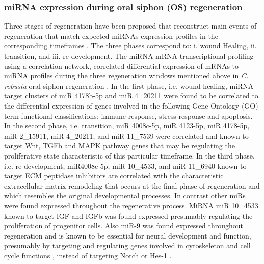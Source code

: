 \documentclass[graybox]{svmult}
\begin{document}
\subsubsection{miRNA expression during oral siphon (OS) regeneration}
Three stages of regeneration have been proposed that reconstruct main events of 
regeneration that match expected miRNAs expression profiles in the 
corresponding timeframes \citep{Knapp:2013}. The three phases correspond to: i. 
wound Healing, ii. transition, and iii. re-development. The miRNA-mRNA 
transcriptional profiling using a correlation network, correlated differential 
expression of mRNAs to miRNA profiles during the three regeneration windows 
mentioned above in \textit{C. robusta} oral siphon regeneration 
\citep{Spina:2017}. In the first phase, i.e. wound healing, miRNA target 
clusters of miR 4178b-5p and 
miR 4\_20211 were found to be correlated to the differential expression of 
genes involved in the following Gene Ontology (GO) term functional 
classifications: immune response, stress response and apoptosis. In the second 
phase, i.e. transition, 
miR 4008c-5p, miR 4123-5p, miR 4178-5p, miR 2\_15911, miR 4\_20211, and miR 
11\_7539 were correlated and known to target Wnt, TGFb and MAPK pathway genes 
that may be regulating the proliferative state characteristic of this particular 
timeframe. In the third phase, i.e. re-development, miR4008c-5p, miR 10\_4533, 
and miR 11\_6940 known to target ECM peptidase inhibitors are correlated with 
the characteristic extracellular matrix remodeling that occurs at the final 
phase of regeneration and which resembles the original developmental processes. 
In contrast other miRs were found expressed throughout the regenerative 
process. MiRNA miR 10\_4533 known to target IGF and IGFb was found expressed 
presumably regulating the proliferation of progenitor cells. Also miR-9 was 
found 
expressed throughout regeneration and is known to be essential for neural 
development and function, presumably by targeting and regulating genes involved 
in cytoskeleton and cell cycle functions \citep{Galderisi:2003rt, 
MCBEATH2004483}, instead of targeting Notch or Hes-1 \citep{Spina:2017}.
\end{document}
